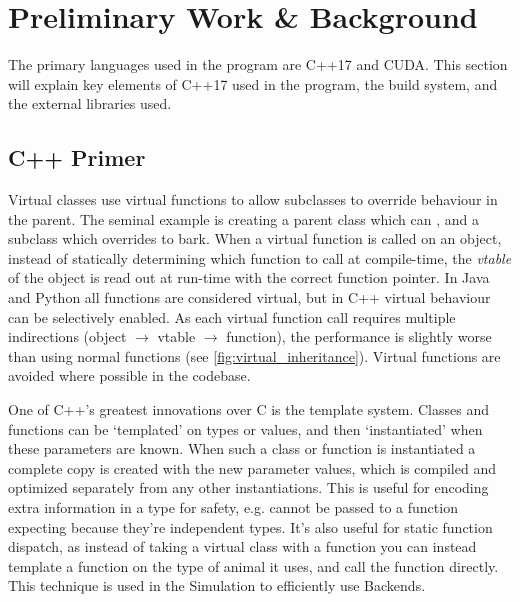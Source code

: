 \section{Preliminary Work \& Background}
The primary languages used in the program are C++17 and CUDA.
This section will explain key elements of C++17 used in the program, the build system, and the external libraries used.

\subsection{C++ Primer}
Virtual classes use virtual functions to allow subclasses to override behaviour in the parent.
The seminal example is creating a parent class  which can , and a subclass  which overrides  to bark.
When a virtual function is called on an object, instead of statically determining which function to call at compile-time, the \emph{vtable} of the object is read out at run-time with the correct function pointer\cite{presentation:RuntimePolymorphism}.
In Java and Python all functions are considered virtual, but in C++ virtual behaviour can be selectively enabled.
As each virtual function call requires multiple indirections (object $\rightarrow$ vtable $\rightarrow$ function), the performance is slightly worse than using normal functions (see \cref{fig:virtual_inheritance}).
Virtual functions are avoided where possible in the codebase.



One of C++'s greatest innovations over C is the template system.
Classes and functions can be `templated' on types or values, and then `instantiated' when these parameters are known.
When such a class or function is instantiated a complete copy is created with the new parameter values, which is compiled and optimized separately from any other instantiations.
This is useful for encoding extra information in a type for safety, e.g.  cannot be passed to a function expecting  because they're independent types.
It's also useful for static function dispatch, as instead of taking a virtual class with a  function you can instead template a function on the type of animal it uses, and call the function directly.
This technique is used in the Simulation to efficiently use Backends.

